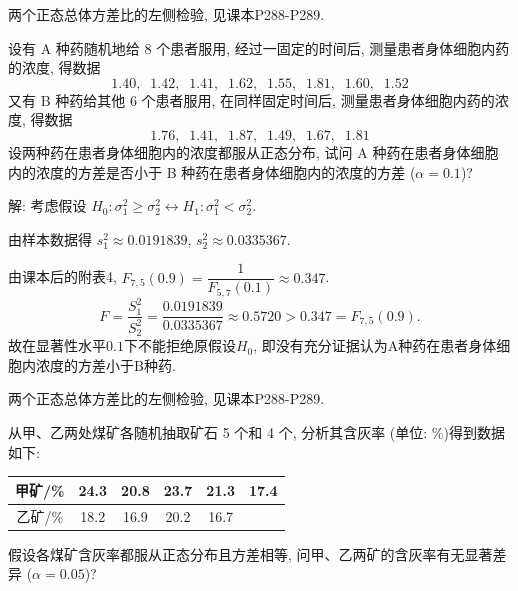 \documentclass[standard]{ExBook}
\renewenvironment{shaded}{%
  \def\FrameCommand{\fboxsep=\FrameSep \colorbox{shadecolor}}%
  \MakeFramed{\advance\hsize-\width \FrameRestore}%
}{%
  \endMakeFramed
}
\begin{document}
\begin{qitems}
\textcolor{themeColor}{\selectfont {} 两个正态总体方差比的左侧检验, 见课本P288-P289.}

\vspace{2.5cm-5em}

    \begin{bbox}
    \begin{shaded}
        \qitem
设有 A 种药随机地给 8 个患者服用, 经过一固定的时间后, 测量患者身体细胞内药的浓度, 得数据
$$1.40, \;\; 1.42, \;\; 1.41, \;\; 1.62, \;\; 1.55, \;\; 1.81, \;\; 1.60, \;\; 1.52$$
又有 B 种药给其他 6 个患者服用, 在同样固定时间后, 测量患者身体细胞内药的浓度, 得数据
$$1.76, \;\; 1.41, \;\; 1.87, \;\; 1.49, \;\; 1.67, \;\; 1.81$$
设两种药在患者身体细胞内的浓度都服从正态分布, 试问 A 种药在患者身体细胞内的浓度的方差是否小于 B 种药在患者身体细胞内的浓度的方差 ($\alpha=0.1$)?
    \end{shaded}
    \end{bbox}

\vspace{\dimexpr2.5cm-5em\relax}

解: 考虑假设
$
H_0:\sigma_1^2\geq\sigma_2^2
\longleftrightarrow
H_1:\sigma_1^2<\sigma_2^2
$.

由样本数据得
$
s_1^2\approx0.0191839
$,
$
s_2^2\approx0.0335367
$.

由课本后的附表4,
$
F_{7,5}(0.9)
=\dfrac{1}{F_{5,7}(0.1)}
\approx0.347
$.
$$
F
=
\frac{S_1^2}{S_2^2}
=
\frac{0.0191839}{0.0335367}
\approx0.5720
>
0.347
=
F_{7,5}(0.9).
$$
故在显著性水平$0.1$下不能拒绝原假设$H_0$, 即没有充分证据认为A种药在患者身体细胞内浓度的方差小于B种药.

\textcolor{themeColor}{\selectfont {} 两个正态总体方差比的左侧检验, 见课本P288-P289.}

\vspace{2.5cm-5em}

    \begin{bbox}
    \begin{shaded}
        \qitem
从甲、乙两处煤矿各随机抽取矿石 5 个和 4 个, 分析其含灰率 (单位: \%)得到数据如下:
\begin{center}
\setlength{\tabcolsep}{27pt}
\begin{tabular}{c|ccccc}
\hline
甲矿/\% & 24.3 & 20.8 & 23.7 & 21.3 & 17.4\\
\hline
乙矿/\% & 18.2 & 16.9 & 20.2 & 16.7 &  \\
\hline
\end{tabular}
\end{center}
假设各煤矿含灰率都服从正态分布且方差相等, 问甲、乙两矿的含灰率有无显著差异 ($\alpha=0.05$)?
    \end{shaded}
    \end{bbox}


\end{qitems}
\end{document}
